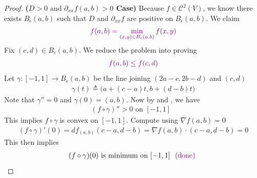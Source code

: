 \documentclass{report}
\begin{document}
\begin{proof}
\textbf{($D>0\text{ and }\partial_{xx}f(a,b)>0$ Case)} Because $f\in\mathcal{C}^2(V)$, we know there exists $B_\epsilon (a,b)$ such that $D$ and $\partial _{xx}f$ are positive on  $B_\epsilon (a,b)$. We claim 
\begin{align*}
  \textcolor{violet}{f(a,b)=\min_{(x,y)\in B_\epsilon (a,b)}f(x,y)}
\end{align*}
Fix $(c,d)\in B_{\epsilon }(a,b)$. We reduce the problem into proving 
\begin{align*}
  \textcolor{violet}{f(a,b)\leq f(c,d)}
\end{align*}
Let $\gamma: [-1,1]\rightarrow B_{\epsilon }(a,b)$ be the line joining $(2a-c,2b-d)$ and $(c,d)$ 
\begin{align*}
\gamma (t)\triangleq \Big(a+(c-a)t, b+(d-b)t \Big)
\end{align*}
Note that $\gamma''=0$ and $\gamma (0)=(a,b)$. Now by  and , we have 
\begin{align*}
  (f\circ \gamma )''>0\text{ on $[-1,1]$ }
\end{align*}
This implies $f\circ \gamma  $ is convex on $[-1,1]$. Compute using $\nabla f(a,b)=0$
 \begin{align*}
   (f\circ \gamma )'(0)=df_{(a,b)}(c-a,d-b)=\nabla f(a,b)\cdot (c-a,d-b)=0 
\end{align*}
This then implies 
\begin{align*}
  (f\circ \gamma )(0)\text{ is minimum on $[-1,1]$ }\textcolor{violet}{\text{ (done) }}
\end{align*}
\end{proof}
\end{document}

